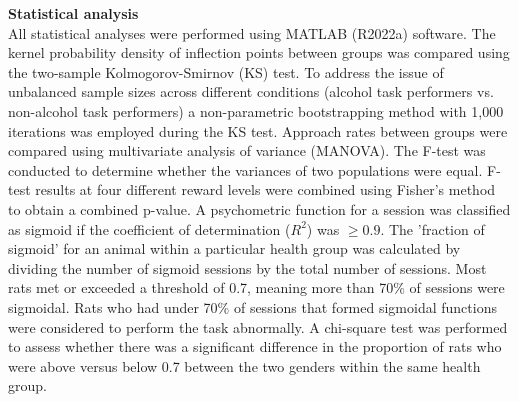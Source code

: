 \documentclass{article}
\begin{document}
\vspace{1em}

\noindent\textbf{Statistical analysis}\\
All statistical analyses were performed using MATLAB (R2022a) software. The kernel probability density of inflection points between groups was compared using the two-sample Kolmogorov-Smirnov (KS) test. To address the issue of unbalanced sample sizes across different conditions (alcohol task performers vs. non-alcohol task performers) a non-parametric bootstrapping method with 1,000 iterations was employed during the KS test. Approach rates between groups were compared using multivariate analysis of variance (MANOVA). The F-test was conducted to determine whether the variances of two populations were equal. F-test results at four different reward levels were combined using Fisher's method to obtain a combined p-value. A psychometric function for a session was classified as sigmoid if the coefficient of determination (\( R^2 \)) was \( \geq 0.9 \). The 'fraction of sigmoid' for an animal within a particular health group was calculated by dividing the number of sigmoid sessions by the total number of sessions. Most rats met or exceeded a threshold of 0.7, meaning more than 70\% of sessions were sigmoidal. Rats who had under 70\% of sessions that formed sigmoidal functions were considered to perform the task abnormally. A chi-square test was performed to assess whether there was a significant difference in the proportion of rats who were above versus below 0.7 between the two genders within the same health group.

\clearpage
\end{document}

